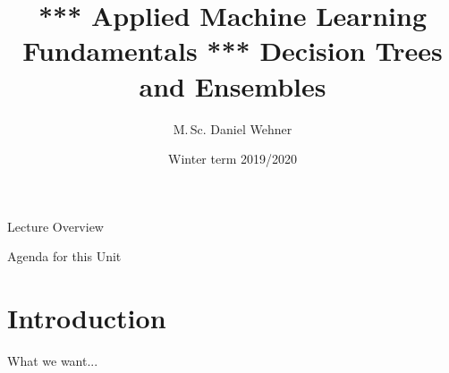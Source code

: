 


\title[Decision Trees and Ensembles]{*** Applied Machine Learning Fundamentals *** Decision Trees and Ensembles}
\author{M.\,Sc. Daniel Wehner}
\date{Winter term 2019/2020}




\maketitlepage


\begin{frame}{Lecture Overview}{}
\end{frame}


\begin{frame}{Agenda for this Unit}
	\begin{multicols}{2}
		\tableofcontents
	\end{multicols}
\end{frame}


\section{Introduction}

\begin{frame}{What we want...}{}
\end{frame}


